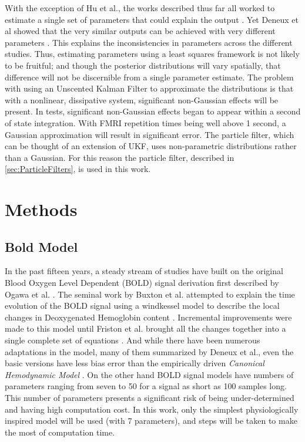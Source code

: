 \documentclass[journal]{./IEEEtran}
\begin{document}
With the exception of Hu et al., the works described thus far all
worked to estimate a single set of parameters that could
explain the output \cite{Hu2009}. Yet Deneux et al showed that the very similar
outputs can be achieved with very different parameters \cite{Deneux2006}.
This explains the inconsistencies in parameters across the different
studies. Thus, estimating parameters using a least squares
framework is not likely to be fruitful; and though the posterior
distributions will vary spatially, that difference will not be
discernible from a single parameter estimate. The problem with 
using an Unscented Kalman Filter to approximate the distributions
is that with a nonlinear, dissipative system, significant non-Gaussian
effects will be present. In tests, significant non-Gaussian effects 
began to appear within a second of state integration. With FMRI
repetition times being well above 1 second, a Gaussian approximation
will result in significant error. The particle filter, which can be
thought of an extension of UKF, uses non-parametric distributions
rather than a Gaussian. For this reason the particle filter, described
in \autoref{sec:ParticleFilters}, is used in this work.

\section{Methods}
\label{sec:Methods}
\subsection{Bold Model}
\label{sec:BoldModel}
In the past fifteen years, a steady stream of studies have built
on the original Blood Oxygen Level Dependent (BOLD) signal 
derivation first described by Ogawa et al. \cite{Ogawa}.
The seminal work by Buxton et al. attempted to explain the
time evolution of the BOLD signal using a windkessel model to
describe the local changes in Deoxygenated Hemoglobin content \cite{Buxton1998}.
Incremental improvements were made to this model until Friston et al.
brought all the changes together into a single complete 
set of equations \cite{Friston2000}. And while there have been numerous adaptations in the model, 
many of them summarized by Deneux et al., even the basic versions
have less bias error than the empirically driven 
\emph{Canonical Hemodynamic Model} \cite{Deneux2006,Handwerker2004}.
On the other hand BOLD signal models have numbers
of parameters ranging from seven \cite{Riera2003} to 50 \cite{Behzadi2005} 
for a signal as short as 100 samples long. This number of parameters presents
a significant risk of being under-determined and having high computation cost. 
In this work, only the simplest physiologically inspired model will be
used (with 7 parameters), and steps will be taken to make the most of computation
time.
\end{document}
